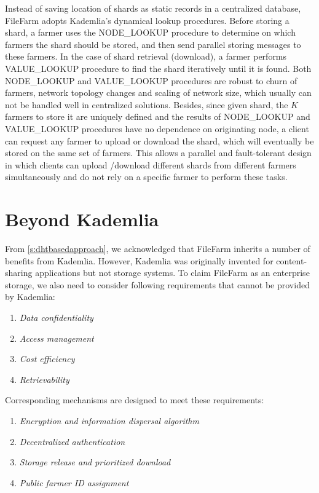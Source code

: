 Instead of saving location of shards as static records in a centralized database, FileFarm adopts Kademlia's dynamical lookup procedures. Before storing a shard, a farmer uses the NODE\_LOOKUP procedure to determine on which farmers the shard should be stored, and then send parallel storing messages to these farmers. In the case of shard retrieval (download), a farmer performs VALUE\_LOOKUP procedure to find the shard iteratively until it is found. Both NODE\_LOOKUP and VALUE\_LOOKUP procedures are robust to churn of farmers, network topology changes and scaling of network size, which usually can not be handled well in centralized solutions. Besides, since given shard, the $K$ farmers to store it are uniquely defined and the results of NODE\_LOOKUP and VALUE\_LOOKUP procedures have no dependence on originating node, a client can request any farmer to upload or download the shard, which will eventually be stored on the same set of farmers. This allows a parallel and fault-tolerant design in which clients can upload /download different shards from different farmers simultaneously and do not rely on a specific farmer to perform these tasks.

\section{Beyond Kademlia}
\label{s:beyondkademlia}

From \ref{s:dhtbasedapproach}, we acknowledged that FileFarm inherits a number of benefits from Kademlia. However, Kademlia was originally invented for content-sharing applications but not storage systems. To claim FileFarm as an enterprise storage, we also need to consider following requirements that cannot be provided by Kademlia:

\begin{enumerate}
  \item \textit{Data confidentiality}
  \item \textit{Access management}
  \item \textit{Cost efficiency}
  \item \textit{Retrievability}
\end{enumerate}

\noindent Corresponding mechanisms are designed to meet these requirements:

\begin{enumerate}
  \item \textit{Encryption and information dispersal algorithm}
  \item \textit{Decentralized authentication}
  \item \textit{Storage release and prioritized download}
  \item \textit{Public farmer ID assignment}
\end{enumerate}

